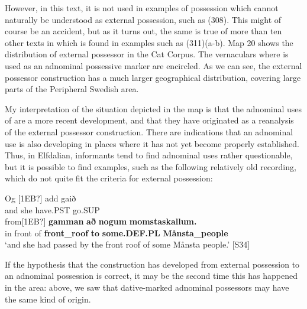 However, in this text, it is not used in examples of possession which cannot naturally be understood as external possession, such as (308). This might of course be an accident, but as it turns out, the same is true of more than ten other texts in which  is found in examples such as (311)(a-b). Map 20 shows the distribution of external possessor  in the Cat Corpus. The vernaculars where  is used as an adnominal possessive marker are encircled. As we can see, the external possessor construction has a much larger geographical distribution, covering large parts of the Peripheral Swedish area. 


My interpretation of the situation depicted in the map is that the adnominal uses of are a more recent development, and that they have originated as a reanalysis of the external possessor construction. There are indications that an adnominal use is also developing in places where it has not yet become properly established. Thus, in Elfdalian, informants tend to find adnominal uses rather questionable, but it is possible to find examples, such as the following relatively old recording, which do not quite fit the criteria for external possession: 


\ea\label{}
\gll Og  [1EB?]  add  gaið\\
and  she  have.PST  go.SUP\\
\gll from[1EB?]  \textbf{gamman} \textbf{að} \textbf{nogum} \textbf{momstaskallum.}\\
in front of   \textbf{front\_roof} \textbf{to} \textbf{some.DEF.PL} \textbf{Månsta\_people}\\
\glt ‘and she had passed by the front roof of some Månsta people.’ [S34]
\z

If the hypothesis that the  construction has developed from external possession to an adnominal possession is correct, it may be the second time this has happened in the area: above, we saw that dative-marked adnominal possessors may have the same kind of origin. 

